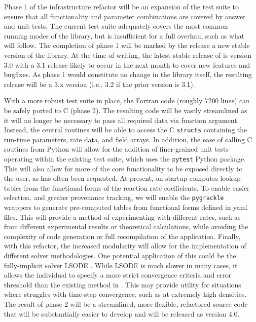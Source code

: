 Phase 1 of the infrastructure refactor will be an expansion of the
test suite to ensure that all functionality and parameter
combinations are covered by answer and unit tests.  The current
test suite adequately covers the most common running modes of the
library, but is insufficient for a full overhaul such as what will
follow.  The completion of phase 1 will be marked by
the release a new stable version of the library.  At the time of
writing, the latest stable release of \grackle{} is version 3.0 with a
3.1 release likely to occur in the next month to cover new features
and bugfixes.  As phase 1 would constitute no change in the library
itself, the resulting release will be a 3.x version (i.e., 3.2 if the
prior version is 3.1).

With a more robust test suite in place, the Fortran code (roughly 7200
lines) can be safely ported to C (phase 2).  The resulting code will
be vastly streamlined as it will no longer be necessary to pass all
required data via function argument.  Instead, the central routines
will be able to access the C \texttt{structs} containing the run-time
parameters, rate data, and field arrays.  In addition, the ease of
calling C routines from Python will allow for the addition of
finer-grained unit tests operating within the existing test suite,
which uses the \texttt{pytest} Python package.  This will also allow
for more of the core functionality to be exposed directly to the user,
as has often been requested.
At present, on startup \grackle{} computes lookup tables from the
functional forms of the reaction rate coefficients.  To enable easier
selection, and greater provenance tracking, we will enable the
\texttt{pygrackle} wrappers to generate pre-computed tables from
functional forms defined in yaml files.  This will provide a method of
experimenting with different rates, such as from different
experimental results or theoretical calculations, while avoiding the
complexity of code generation or full recompilation of the
application.  Finally, with this refactor, the
increased modularity will allow for the implementation of different
solver methodologies.  One potential application of this could be the
fully-implicit solver LSODE \citep{LSODE}.  While LSODE is much slower in many
cases, it allows the individual to specify a more strict convergence
criteria and error threshold than the existing method in \grackle{}.
This may provide utility for situations where \grackle{} struggles
with time-step convergence, such as at extremely high densities.
The result of phase 2 will be a streamlined, more flexible,
refactored source code that will be substantially easier to develop
and will be released as \grackle{} version 4.0.

